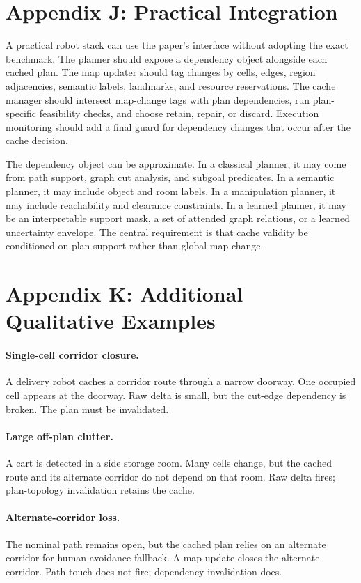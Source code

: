 \documentclass{article}
\begin{document}
\section{Appendix J: Practical Integration}

A practical robot stack can use the paper's interface without adopting the exact benchmark. The planner should expose a dependency object alongside each cached plan. The map updater should tag changes by cells, edges, region adjacencies, semantic labels, landmarks, and resource reservations. The cache manager should intersect map-change tags with plan dependencies, run plan-specific feasibility checks, and choose retain, repair, or discard. Execution monitoring should add a final guard for dependency changes that occur after the cache decision.

The dependency object can be approximate. In a classical planner, it may come from path support, graph cut analysis, and subgoal predicates. In a semantic planner, it may include object and room labels. In a manipulation planner, it may include reachability and clearance constraints. In a learned planner, it may be an interpretable support mask, a set of attended graph relations, or a learned uncertainty envelope. The central requirement is that cache validity be conditioned on plan support rather than global map change.

\section{Appendix K: Additional Qualitative Examples}

\paragraph{Single-cell corridor closure.}
A delivery robot caches a corridor route through a narrow doorway. One occupied cell appears at the doorway. Raw delta is small, but the cut-edge dependency is broken. The plan must be invalidated.

\paragraph{Large off-plan clutter.}
A cart is detected in a side storage room. Many cells change, but the cached route and its alternate corridor do not depend on that room. Raw delta fires; plan-topology invalidation retains the cache.

\paragraph{Alternate-corridor loss.}
The nominal path remains open, but the cached plan relies on an alternate corridor for human-avoidance fallback. A map update closes the alternate corridor. Path touch does not fire; dependency invalidation does.
\end{document}
